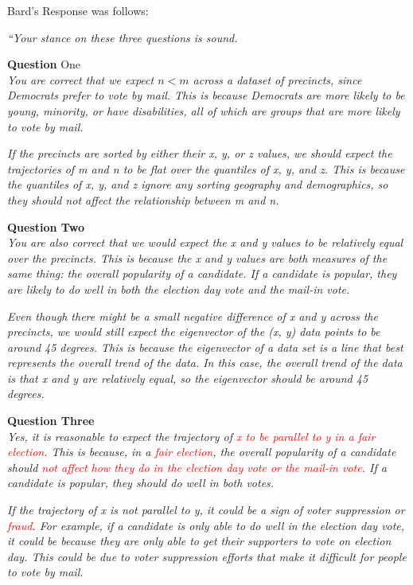\documentclass[preprint,13pt]{elsarticle}
\begin{document}
Bard's Response was follows:

\textit{``Your stance on these three questions is sound.}

\textbf{Question} One\\
\textit{You are correct that we expect $n<m$ across a dataset of precincts, since Democrats prefer to vote by mail. This is because Democrats are more likely to be young, minority, or have disabilities, all of which are groups that are more likely to vote by mail.}

\textit{If the precincts are sorted by either their x, y, or z values, we should expect the trajectories of m and n to be flat over the quantiles of x, y, and z. This is because the quantiles of x, y, and z ignore any sorting geography and demographics, so they should not affect the relationship between m and n.}

\textbf{Question Two}\\
\textit{You are also correct that we would expect the x and y values to be relatively equal over the precincts. This is because the x and y values are both measures of the same thing: the overall popularity of a candidate. If a candidate is popular, they are likely to do well in both the election day vote and the mail-in vote.}

\textit{Even though there might be a small negative difference of x and y across the precincts, we would still expect the eigenvector of the (x, y) data points to be around 45 degrees. This is because the eigenvector of a data set is a line that best represents the overall trend of the data. In this case, the overall trend of the data is that x and y are relatively equal, so the eigenvector should be around 45 degrees.}

\textbf{Question Three}\\
\textit{Yes, it is reasonable to expect the trajectory of \textcolor{red}{x to be parallel to y in a fair election}. This is because, in a \textcolor{red}{fair election}, the overall popularity of a candidate should \textcolor{red}{not affect how they do in the election day vote or the mail-in vote}. If a candidate is popular, they should do well in both votes.}

\textit{If the trajectory of x is not parallel to y, it could be a sign of voter suppression or \textcolor{red}{fraud}. For example, if a candidate is only able to do well in the election day vote, it could be because they are only able to get their supporters to vote on election day. This could be due to voter suppression efforts that make it difficult for people to vote by mail.}
\end{document}
